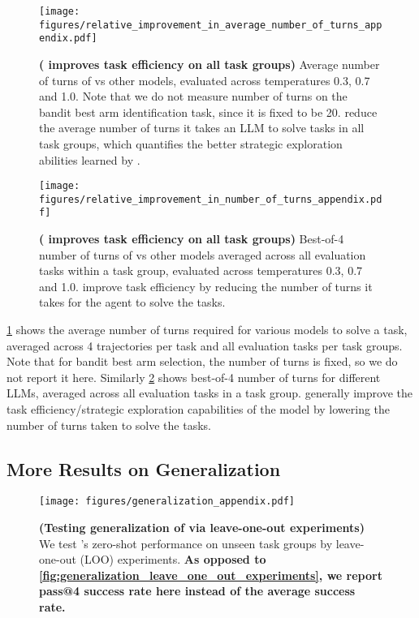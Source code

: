 \begin{figure}[h!]
    \centering
    \texttt{[image: figures/relative\_improvement\_in\_average\_number\_of\_turns\_appendix.pdf]}
    \caption{\textbf{(\ours{} improves task efficiency on all task groups)} Average number of turns of \ours{} vs other models, evaluated across temperatures 0.3, 0.7 and 1.0. Note that we do not measure number of turns on the bandit best arm identification task, since it is fixed to be 20. \ours{} reduce the average number of turns it takes an LLM to solve tasks in all task groups, which quantifies the better strategic exploration abilities learned by \ours{}.}
    \label{fig:all_environment_temperature_ablation_num_turns}
\end{figure}

\begin{figure}[h!]
    \centering
    \texttt{[image: figures/relative\_improvement\_in\_number\_of\_turns\_appendix.pdf]}
    \caption{\textbf{(\ours{} improves task efficiency on all task groups)} Best-of-4 number of turns of \ours{} vs other models averaged across all evaluation tasks within a task group, evaluated across temperatures 0.3, 0.7 and 1.0. \ours{} improve task efficiency by reducing the number of turns it takes for the agent to solve the tasks.}
    \label{fig:all_environment_temperature_ablation_num_turns_best_of_4}
\end{figure}

\cref{fig:all_environment_temperature_ablation_num_turns} shows the average number of turns required for various models to solve a task, averaged across 4 trajectories per task and all evaluation tasks per task groups. Note that for bandit best arm selection, the number of turns is fixed, so we do not report it here. Similarly \cref{fig:all_environment_temperature_ablation_num_turns_best_of_4} shows best-of-4 number of turns for different LLMs, averaged across all evaluation tasks in a task group. \ours{} generally improve the task efficiency/strategic exploration capabilities of the model by lowering the number of turns taken to solve the tasks.

\subsection{More Results on Generalization}

\begin{figure*}[h!]
    \centering
    \texttt{[image: figures/generalization\_appendix.pdf]}
    \vspace{-0.2cm}
    \caption{\footnotesize \textbf{(Testing generalization of \ours{} via leave-one-out experiments)} We test \ours{}'s zero-shot performance on unseen task groups by leave-one-out (LOO) experiments. \textbf{As opposed to \cref{fig:generalization_leave_one_out_experiments}, we report pass@4 success rate here instead of the average success rate.}}
    \label{fig:generalization_leave_one_out_experiments_appendix}
    \vspace{-0.2cm}
\end{figure*}

